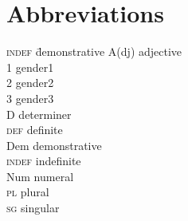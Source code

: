 \documentclass[output=paper]{langscibook}
\begin{document}



\section*{Abbreviations}


\begin{multicols}{3}
\begin{tabbing}
\textsc{indef} \= demonstrative\kill
A(dj) \> adjective\\
1 \> gender1\\
2 \> gender2\\
3 \> gender3\\
D \> determiner\\
\textsc{def} \> definite\\
Dem \> demonstrative\\
\textsc{indef} \> indefinite\\
Num \> numeral\\
\textsc{pl} \> plural\\
\textsc{sg} \> singular
\end{tabbing}
\end{multicols}


{\sloppy
\printbibliography[heading=subbibliography,notkeyword=this] 
}
\end{document}
